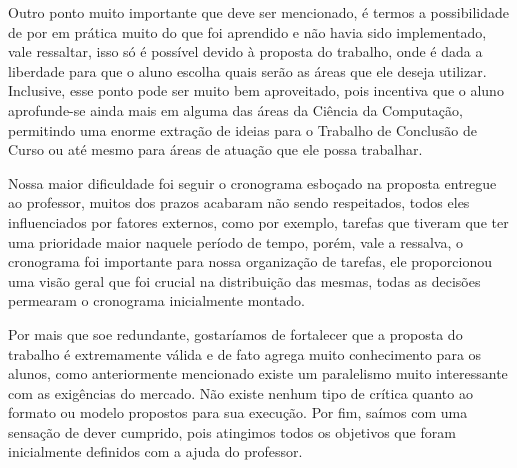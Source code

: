 Outro ponto muito importante que deve ser mencionado, é termos a possibilidade de por em prática muito do que foi aprendido e não havia sido implementado, vale ressaltar, isso só é possível devido à proposta do trabalho, onde é dada a liberdade para que o aluno escolha quais serão as áreas que ele deseja utilizar. Inclusive, esse ponto pode ser muito bem aproveitado, pois incentiva que o aluno aprofunde-se ainda mais em alguma das áreas da Ciência da Computação, permitindo uma enorme extração de ideias para o Trabalho de Conclusão de Curso ou até mesmo para áreas de atuação que ele possa trabalhar.

Nossa maior dificuldade foi seguir o cronograma esboçado na proposta entregue ao professor, muitos dos prazos acabaram não sendo respeitados, todos eles influenciados por fatores externos, como por exemplo, tarefas que tiveram que ter uma prioridade maior naquele período de tempo, porém, vale a ressalva, o cronograma foi importante para nossa organização de tarefas, ele proporcionou uma visão geral que foi crucial na distribuição das mesmas, todas as decisões permearam o cronograma inicialmente montado.

Por mais que soe redundante, gostaríamos de fortalecer que a proposta do trabalho é extremamente válida e de fato agrega muito conhecimento para os alunos, como anteriormente mencionado existe um paralelismo muito interessante com as exigências do mercado. Não existe nenhum tipo de crítica quanto ao formato ou modelo propostos para sua execução. Por fim, saímos com uma sensação de dever cumprido, pois atingimos todos os objetivos que foram inicialmente definidos com a ajuda do professor.